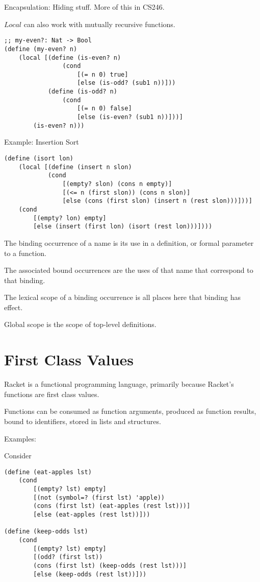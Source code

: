 \documentclass{article}
\begin{document}
Encapsulation: Hiding stuff. More of this in CS246.

$Local$ can also work with mutually recursive functions.

\begin{lstlisting}
;; my-even?: Nat -> Bool
(define (my-even? n)
    (local [(define (is-even? n)
                (cond
                    [(= n 0) true]
                    [else (is-odd? (sub1 n))]))
            (define (is-odd? n)
                (cond
                    [(= n 0) false]
                    [else (is-even? (sub1 n))]))]
        (is-even? n)))
\end{lstlisting}

Example: Insertion Sort

\begin{lstlisting}
(define (isort lon)
    (local [(define (insert n slon)
            (cond
                [(empty? slon) (cons n empty)]
                [(<= n (first slon)) (cons n slon)]
                [else (cons (first slon) (insert n (rest slon)))]))]
    (cond
        [(empty? lon) empty]
        [else (insert (first lon) (isort (rest lon)))])))
\end{lstlisting}

The binding occurrence of a name is its use in a definition, or formal parameter to a function. 

The associated bound occurrences are the uses of that name that correspond to that binding. 

The lexical scope of a binding occurrence is all places here that binding has effect. 

Global scope is the scope of top-level definitions. 

\section{First Class Values}

Racket is a functional programming language, primarily because Racket's functions are first class values. 

Functions can be consumed as function arguments, produced as function results, bound to identifiers, stored in lists and structures. 

Examples:

Consider

\begin{lstlisting}
(define (eat-apples lst)
    (cond
        [(empty? lst) empty]
        [(not (symbol=? (first lst) 'apple))
        (cons (first lst) (eat-apples (rest lst)))]
        [else (eat-apples (rest lst))]))

(define (keep-odds lst)
    (cond
        [(empty? lst) empty]
        [(odd? (first lst))
        (cons (first lst) (keep-odds (rest lst)))]
        [else (keep-odds (rest lst))]))
\end{lstlisting}
\end{document}
